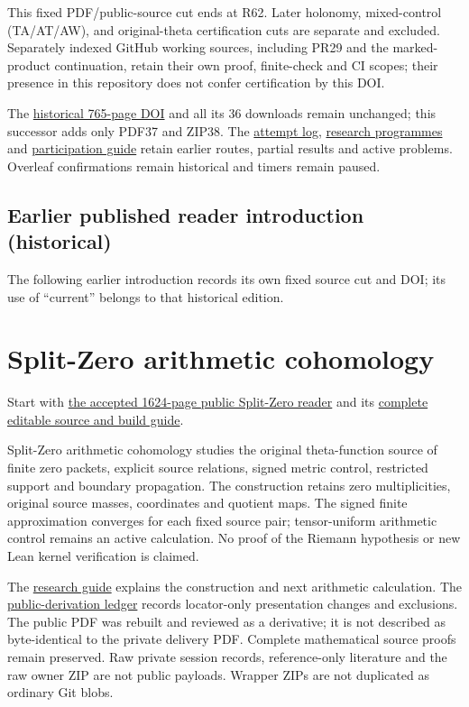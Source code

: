 \documentclass[
]{article}
\begin{document}
This fixed PDF/public-source cut ends at R62. Later holonomy,
mixed-control (TA/AT/AW), and original-theta certification cuts are
separate and excluded. Separately indexed GitHub working sources,
including PR29 and the marked-product continuation, retain their own
proof, finite-check and CI scopes; their presence in this repository
does not confer certification by this DOI.

The \href{https://doi.org/10.5281/zenodo.22736292}{historical 765-page
DOI} and all its 36 downloads remain unchanged; this successor adds only
PDF37 and ZIP38. The \href{ATTEMPTS.md}{attempt log},
\href{RESEARCH_PROGRAMMES.md}{research programmes} and
\href{POLYCLANK_PARTICIPATION.md}{participation guide} retain earlier
routes, partial results and active problems. Overleaf confirmations
remain historical and timers remain paused.

\subsection{Earlier published reader introduction
(historical)}\label{earlier-published-reader-introduction-historical-1}

The following earlier introduction records its own fixed source cut and
DOI; its use of ``current'' belongs to that historical edition.

\section{Split-Zero arithmetic
cohomology}\label{split-zero-arithmetic-cohomology-1}

Start with
\href{https://zenodo.org/api/records/22739630/files/39-splitzero-recursive-source-relations-public-reader.pdf/content}{the
accepted 1624-page public Split-Zero reader} and its
\href{workbenches/splitzero-tandem/continuations/20260914-recursive-source-relations/README.md}{complete
editable source and build guide}.

Split-Zero arithmetic cohomology studies the original theta-function
source of finite zero packets, explicit source relations, signed metric
control, restricted support and boundary propagation. The construction
retains zero multiplicities, original source masses, coordinates and
quotient maps. The signed finite approximation converges for each fixed
source pair; tensor-uniform arithmetic control remains an active
calculation. No proof of the Riemann hypothesis or new Lean kernel
verification is claimed.

The \href{CURRENT_RESEARCH.md}{research guide} explains the construction
and next arithmetic calculation. The
\href{workbenches/splitzero-tandem/continuations/20260914-recursive-source-relations/PUBLIC_DERIVATION.md}{public-derivation
ledger} records locator-only presentation changes and exclusions. The
public PDF was rebuilt and reviewed as a derivative; it is not described
as byte-identical to the private delivery PDF. Complete mathematical
source proofs remain preserved. Raw private session records,
reference-only literature and the raw owner ZIP are not public payloads.
Wrapper ZIPs are not duplicated as ordinary Git blobs.
\end{document}
